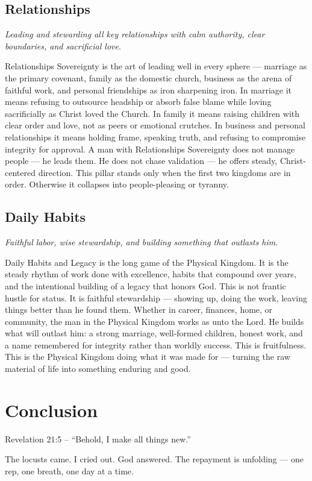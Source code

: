 \documentclass[12pt,a4paper]{book}
\begin{document}
\section{Relationships}
\textit{Leading and stewarding all key relationships with calm authority, clear boundaries, and sacrificial love}.

Relationships Sovereignty is the art of leading well in every sphere — marriage as the primary covenant, family as the domestic church, business as the arena of faithful work, and personal friendships as iron sharpening iron. In marriage it means refusing to outsource headship or absorb false blame while loving sacrificially as Christ loved the Church. In family it means raising children with clear order and love, not as peers or emotional crutches. In business and personal relationships it means holding frame, speaking truth, and refusing to compromise integrity for approval. A man with Relationships Sovereignty does not manage people — he leads them. He does not chase validation — he offers steady, Christ-centered direction. This pillar stands only when the first two kingdoms are in order. Otherwise it collapses into people-pleasing or tyranny.

\section{Daily Habits}

\textit{Faithful labor, wise stewardship, and building something that outlasts him}.

Daily Habits and Legacy is the long game of the Physical Kingdom. It is the steady rhythm of work done with excellence, habits that compound over years, and the intentional building of a legacy that honors God. This is not frantic hustle for status. It is faithful stewardship — showing up, doing the work, leaving things better than he found them. Whether in career, finances, home, or community, the man in the Physical Kingdom works as unto the Lord. He builds what will outlast him: a strong marriage, well-formed children, honest work, and a name remembered for integrity rather than worldly success. This is fruitfulness. This is the Physical Kingdom doing what it was made for — turning the raw material of life into something enduring and good.

\chapter*{Conclusion}

Revelation 21:5 – “Behold, I make all things new.”

The locusts came.  
I cried out.  
God answered.  
The repayment is unfolding — one rep, one breath, one day at a time.
\end{document}
